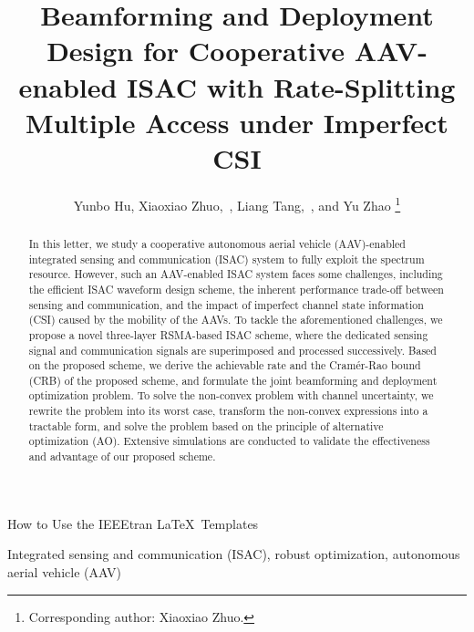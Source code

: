 \documentclass[twocolumn,journal]{IEEEtran}
\begin{document}
\title{Beamforming and Deployment Design for Cooperative AAV-enabled ISAC with Rate-Splitting Multiple Access under Imperfect CSI}
\author{Yunbo Hu, Xiaoxiao Zhuo,~, Liang Tang,~, and Yu Zhao
\thanks{Corresponding author: Xiaoxiao Zhuo.}}

%
{How to Use the IEEEtran \LaTeX \ Templates}

\maketitle

\begin{abstract}
In this letter, we study a cooperative autonomous aerial vehicle (AAV)-enabled integrated sensing and communication (ISAC) system to fully exploit the spectrum resource. However, such an AAV-enabled ISAC system faces some challenges, including the efficient ISAC waveform design scheme, the inherent performance trade-off between sensing and communication, and the impact of imperfect channel state information (CSI) caused by the mobility of the AAVs. To tackle the aforementioned challenges, we propose a novel three-layer RSMA-based ISAC scheme, where the dedicated sensing signal and communication signals are superimposed and processed successively. Based on the proposed scheme, we derive the achievable rate and the Cramér-Rao bound (CRB) of the proposed scheme, and formulate the joint beamforming and deployment optimization problem. To solve the non-convex problem with channel uncertainty, we rewrite the problem into its worst case, transform the non-convex expressions into a tractable form, and solve the problem based on the principle of alternative optimization (AO). Extensive simulations are conducted to validate the effectiveness and advantage of our proposed scheme.
\end{abstract}

\begin{IEEEkeywords}
Integrated sensing and communication (ISAC), robust optimization, autonomous aerial vehicle (AAV)
\end{IEEEkeywords}
\end{document}
